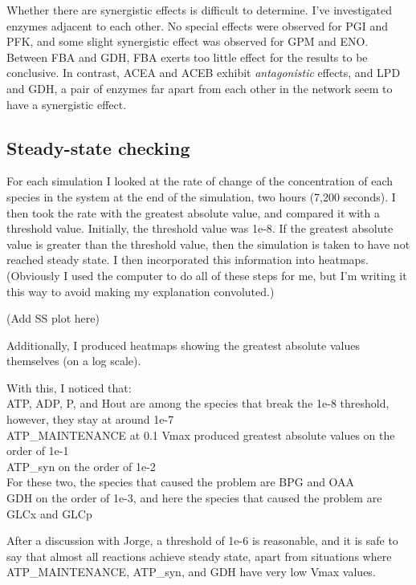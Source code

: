\documentclass[parskip=full]{scrreprt}
\begin{document}
Whether there are synergistic effects is difficult to determine. I’ve investigated enzymes adjacent to each other. No special effects were observed for PGI and PFK, and some slight synergistic effect was observed for GPM and ENO. Between FBA and GDH, FBA exerts too little effect for the results to be conclusive. In contrast, ACEA and ACEB exhibit \emph{antagonistic} effects, and LPD and GDH, a pair of enzymes far apart from each other in the network seem to have a synergistic effect.

\subsection{Steady-state checking}
\label{ssec:steadystate}

For each simulation I looked at the rate of change of the concentration of each species in the system at the end of the simulation, two hours (7,200 seconds). I then took the rate with the greatest absolute value, and compared it with a threshold value. Initially, the threshold value was 1e-8. If the greatest absolute value is greater than the threshold value, then the simulation is taken to have not reached steady state. I then incorporated this information into heatmaps. (Obviously I used the computer to do all of these steps for me, but I’m writing it this way to avoid making my explanation convoluted.)

(Add SS plot here)

Additionally, I produced heatmaps showing the greatest absolute values themselves (on a log scale).

With this, I noticed that:\\
ATP, ADP, P, and Hout are among the species that break the 1e-8 threshold, however, they stay at around 1e-7\\
ATP\_MAINTENANCE at 0.1 Vmax produced greatest absolute values on the order of 1e-1\\
ATP\_syn on the order of 1e-2\\
For these two, the species that caused the problem are BPG and OAA\\
GDH on the order of 1e-3, and here the species that caused the problem are GLCx and GLCp

After a discussion with Jorge, a threshold of 1e-6 is reasonable, and it is safe to say that almost all reactions achieve steady state, apart from situations where ATP\_MAINTENANCE, ATP\_syn, and GDH have very low Vmax values.

\end{document}
